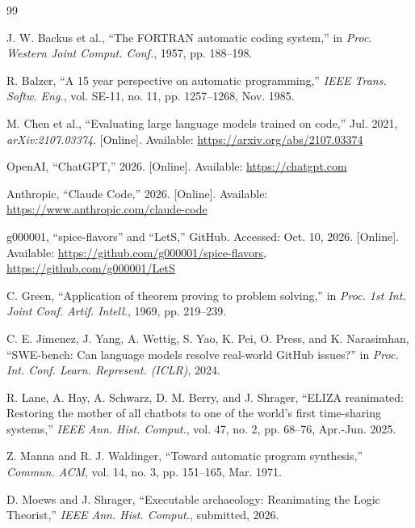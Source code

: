 \documentclass[11pt]{article}
\begin{document}
\begin{thebibliography}{99}

 J. W. Backus et al., ``The FORTRAN
  automatic coding system,'' in \textit{Proc. Western Joint
  Comput. Conf.}, 1957, pp. 188--198.

 R. Balzer, ``A 15 year perspective on automatic
  programming,'' \textit{IEEE Trans. Softw. Eng.}, vol. SE-11, no. 11,
  pp. 1257--1268, Nov. 1985.

 M. Chen et al., ``Evaluating large language
  models trained on code,'' Jul. 2021, \textit{arXiv:2107.03374}. [Online]. Available:
  \url{https://arxiv.org/abs/2107.03374}

 OpenAI, ``ChatGPT,'' 2026. [Online]. Available:
  \url{https://chatgpt.com}

 Anthropic, ``Claude Code,'' 2026. [Online]. Available:
  \url{https://www.anthropic.com/claude-code}

 g000001, ``spice-flavors'' and ``LetS,'' GitHub.
  Accessed: Oct. 10, 2026. [Online]. Available:
  \url{https://github.com/g000001/spice-flavors},
  \url{https://github.com/g000001/LetS}

 C. Green, ``Application of theorem proving to
  problem solving,'' in \textit{Proc. 1st Int. Joint Conf. Artif.
  Intell.}, 1969, pp. 219--239.

 C. E. Jimenez, J. Yang, A. Wettig,
  S. Yao, K. Pei, O. Press, and K. Narasimhan, ``SWE-bench: Can
  language models resolve real-world GitHub issues?'' in
  \textit{Proc. Int. Conf. Learn. Represent. (ICLR)}, 2024.

 R. Lane, A. Hay, A. Schwarz, D. M. Berry, and
  J. Shrager, ``ELIZA reanimated: Restoring the mother of all chatbots
  to one of the world's first time-sharing systems,'' \textit{IEEE
  Ann. Hist. Comput.}, vol. 47, no. 2, pp. 68--76, Apr.-Jun. 2025.

 Z. Manna and R. J. Waldinger, ``Toward
  automatic program synthesis,'' \textit{Commun. ACM}, vol. 14, no. 3,
  pp. 151--165, Mar. 1971.

 D. Moews and J. Shrager, ``Executable
  archaeology: Reanimating the Logic Theorist,'' \textit{IEEE Ann. Hist.
  Comput.}, submitted, 2026.


\end{thebibliography}
\end{document}
